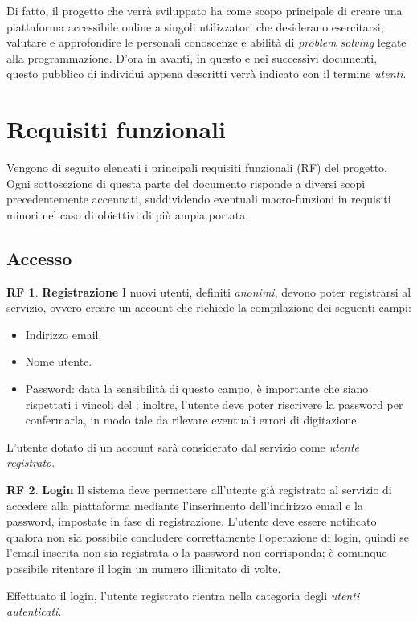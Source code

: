\documentclass[11pt, a4paper]{article}
\theoremstyle{definition}
\newtheorem{funcreq}{RF} %
\begin{document}
Di fatto, il progetto che verrà sviluppato ha come scopo principale di
creare una piattaforma accessibile online a singoli utilizzatori che
desiderano esercitarsi, valutare e approfondire le personali
conoscenze e abilità di \textit{problem solving} legate alla programmazione.
D'ora in avanti, in questo e nei successivi documenti, questo pubblico di
individui appena descritti verrà indicato con il termine \textit{utenti}.

\newpage
\section{Requisiti funzionali}
Vengono di seguito elencati i principali requisiti funzionali (RF)
del progetto. Ogni sottosezione di questa parte del documento
risponde a diversi scopi precedentemente accennati, suddividendo
eventuali macro-funzioni in requisiti minori nel caso di obiettivi
di più ampia portata.

\subsection{Accesso}

\begin{funcreq}
\label{signup}
\textbf{Registrazione }
I nuovi utenti, definiti \textit{anonimi}, devono poter registrarsi al
servizio, ovvero creare un account che richiede la compilazione dei seguenti
campi:
\begin{itemize}
    \item Indirizzo email.
    \item Nome utente.
    \item Password: data la sensibilità di questo campo, è importante
    che siano rispettati i vincoli del \textcolor{blue}{};
    inoltre, l'utente deve poter riscrivere la password per confermarla, in
    modo tale da rilevare eventuali errori di digitazione.
\end{itemize}
L'utente dotato di un account sarà considerato dal servizio come \textit{utente
registrato}.
\end{funcreq}

\begin{funcreq}
\label{login}
\textbf{Login }
Il sistema deve permettere all'utente già registrato al servizio di
accedere alla piattaforma mediante l'inserimento dell'indirizzo
email e la password, impostate in fase di registrazione. L'utente deve
essere notificato qualora non sia possibile concludere correttamente
l'operazione di login, quindi se l'email inserita non sia registrata o
la password non corrisponda; è comunque possibile ritentare il login un
numero illimitato di volte.

Effettuato il login, l'utente registrato rientra nella categoria degli
\textit{utenti autenticati}.
\end{funcreq}
\end{document}
